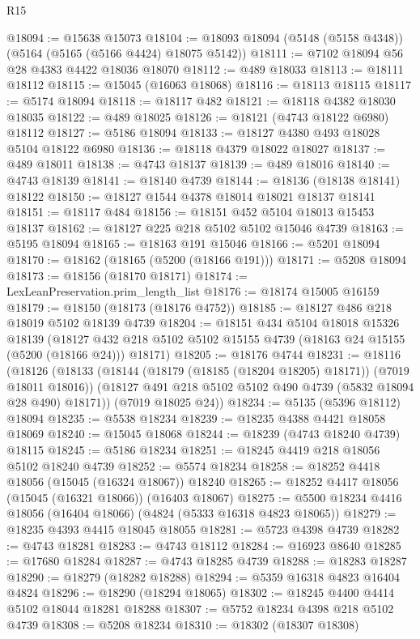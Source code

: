 \begin{lexlean}{R15}
\begin{coremodule}
{{{{{{{{{{{@18094 := @15638 @15073
@18104 := @18093 @18094 (@5148 (@5158 @4348)) (@5164 (@5165 (@5166 @4424) @18075 @5142))
@18111 := @7102 @18094 @56 @28 @4383 @4422 @18036 @18070
@18112 := @489 @18033
@18113 := @18111 @18112
@18115 := @15045 (@16063 @18068)
@18116 := @18113 @18115
@18117 := @5174 @18094
@18118 := @18117 @482
@18121 := @18118 @4382 @18030 @18035
@18122 := @489 @18025
@18126 := @18121 (@4743 @18122 @6980) @18112
@18127 := @5186 @18094
@18133 := @18127 @4380 @493 @18028 @5104 @18122 @6980
@18136 := @18118 @4379 @18022 @18027
@18137 := @489 @18011
@18138 := @4743 @18137
@18139 := @489 @18016
@18140 := @4743 @18139
@18141 := @18140 @4739
@18144 := @18136 (@18138 @18141) @18122
@18150 := @18127 @1544 @4378 @18014 @18021 @18137 @18141
@18151 := @18117 @484
@18156 := @18151 @452 @5104 @18013 @15453 @18137
@18162 := @18127 @225 @218 @5102 @5102 @15046 @4739
@18163 := @5195 @18094
@18165 := @18163 @191 @15046
@18166 := @5201 @18094
@18170 := @18162 (@18165 (@5200 (@18166 @191)))
@18171 := @5208 @18094
@18173 := @18156 (@18170 @18171)
@18174 := LexLeanPreservation.prim_length_list
@18176 := @18174 @15005 @16159
@18179 := @18150 (@18173 (@18176 @4752))
@18185 := @18127 @486 @218 @18019 @5102 @18139 @4739
@18204 := @18151
    @434
    @5104
    @18018
    @15326
    @18139
    (@18127 @432 @218 @5102 @5102 @15155 @4739 (@18163 @24 @15155 (@5200 (@18166 @24))) @18171)
@18205 := @18176 @4744
@18231 := @18116
    (@18126
      (@18133
        (@18144 (@18179 (@18185 (@18204 @18205) @18171)) (@7019 @18011 @18016))
        (@18127 @491 @218 @5102 @5102 @490 @4739 (@5832 @18094 @28 @490) @18171))
      (@7019 @18025 @24))
@18234 := @5135 (@5396 @18112) @18094
@18235 := @5538 @18234
@18239 := @18235 @4388 @4421 @18058 @18069
@18240 := @15045 @18068
@18244 := @18239 (@4743 @18240 @4739) @18115
@18245 := @5186 @18234
@18251 := @18245 @4419 @218 @18056 @5102 @18240 @4739
@18252 := @5574 @18234
@18258 := @18252 @4418 @18056 (@15045 (@16324 @18067)) @18240
@18265 := @18252 @4417 @18056 (@15045 (@16321 @18066)) (@16403 @18067)
@18275 := @5500 @18234 @4416 @18056 (@16404 @18066) (@4824 (@5333 @16318 @4823 @18065))
@18279 := @18235 @4393 @4415 @18045 @18055
@18281 := @5723 @4398 @4739
@18282 := @4743 @18281
@18283 := @4743 @18112
@18284 := @16923 @8640
@18285 := @17680 @18284
@18287 := @4743 @18285 @4739
@18288 := @18283 @18287
@18290 := @18279 (@18282 @18288)
@18294 := @5359 @16318 @4823 @16404 @4824
@18296 := @18290 (@18294 @18065)
@18302 := @18245 @4400 @4414 @5102 @18044 @18281 @18288
@18307 := @5752 @18234 @4398 @218 @5102 @4739
@18308 := @5208 @18234
@18310 := @18302 (@18307 @18308)
}}}}}}}}}}}
\end{coremodule}
\end{lexlean}
